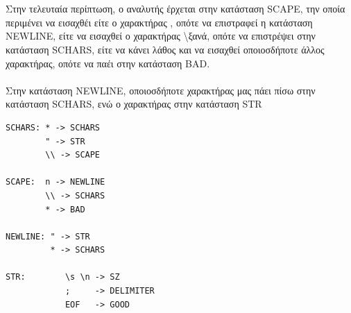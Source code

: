 \documentclass[14pt]{extarticle}
\begin{document}
\\
\\
Στην τελευταία περίπτωση, ο αναλυτής έρχεται στην κατάσταση \textlatin{SCAPE}, την οποία περιμένει να εισαχθέι είτε ο χαρακτήρας , οπότε να επιστραφεί η κατάσταση \textlatin{NEWLINE}, είτε να εισαχθεί ο χαρακτήρας \textbackslash  ξανά, οπότε να επιστρέψει στην κατάσταση \textlatin{SCHARS}, είτε να κάνει λάθος και να εισαχθεί οποιοσδήποτε άλλος χαρακτήρας, οπότε να παέι στην κατάσταση \textlatin{BAD}.  
\\
\\
Στην κατάσταση \textlatin{NEWLINE}, οποιοσδήποτε χαρακτήρας μας πάει πίσω στην κατάσταση \textlatin{SCHARS}, ενώ ο χαρακτήρας  στην κατάσταση \textlatin{STR}
\\
    \begin{lstlisting}
SCHARS: * -> SCHARS
        " -> STR
        \\ -> SCAPE

SCAPE:  n -> NEWLINE
        \\ -> SCHARS
        * -> BAD

NEWLINE: " -> STR
         * -> SCHARS 

STR:        \s \n -> SZ
            ;     -> DELIMITER
            EOF   -> GOOD
    \end{lstlisting}
\end{document}
